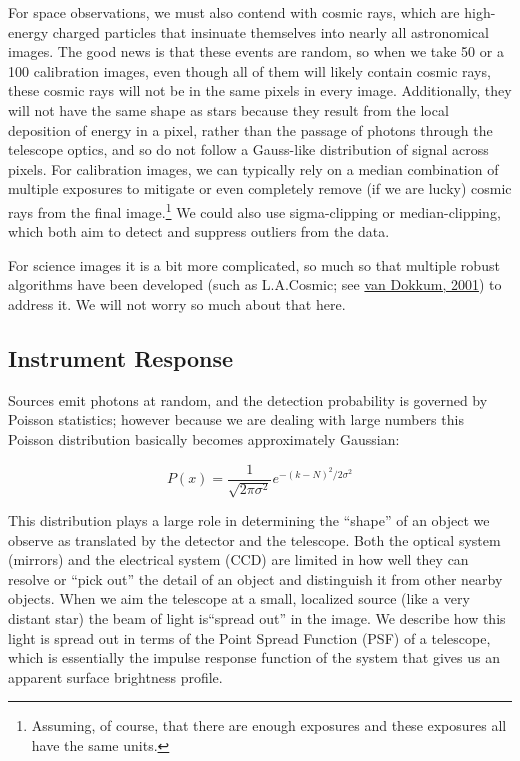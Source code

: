 \documentclass{tufte-book}
\begin{document}
For space observations, we must also contend with cosmic rays, which are high-energy charged particles that insinuate themselves into nearly all astronomical images. The good news is that these events are random, so when we take 50 or a 100 calibration images, even though all of them will likely contain cosmic rays, these cosmic rays will not be in the same pixels in every image. Additionally, they will not have the same shape as stars because they result from the local deposition of energy in a pixel, rather than the passage of photons through the telescope optics, and so do not follow a Gauss-like distribution of signal across pixels. For calibration images, we can typically rely on a median combination of multiple exposures to mitigate or even completely remove (if we are lucky) cosmic rays from the final image.\footnote{Assuming, of course, that there are enough exposures and these exposures all have the same units.} We could also use sigma-clipping or median-clipping, which both aim to detect and suppress outliers from the data.

For science images it is a bit more complicated, so much so that multiple robust algorithms have been developed (such as L.A.Cosmic; see \href{https://ui.adsabs.harvard.edu/abs/2001PASP..113.1420V/abstract}{van Dokkum, 2001}) to address it. We will not worry so much about that here. %

\subsection{Instrument Response}

Sources emit photons at random, and the detection probability is governed by Poisson statistics; however because we are dealing with large numbers this Poisson distribution basically becomes approximately Gaussian:

\begin{equation}
P(x) = \frac{1}{\sqrt{2\pi\sigma^2}}e^{-(k-N)^2 / 2\sigma^2}
\end{equation}

This distribution plays a large role in determining the ``shape'' of an object we observe as translated by the detector and the telescope. Both the optical system (mirrors) and the electrical system (CCD) are limited in how well they can resolve or ``pick out'' the detail of an object and distinguish it from other nearby objects. When we aim the telescope at a small, localized source (like a very distant star) the beam of light is``spread out'' in the image. We describe how this light is spread out in terms of the Point Spread Function (PSF) of a telescope, which is essentially the impulse response function of the system that gives us an apparent surface brightness profile. 
\end{document}
